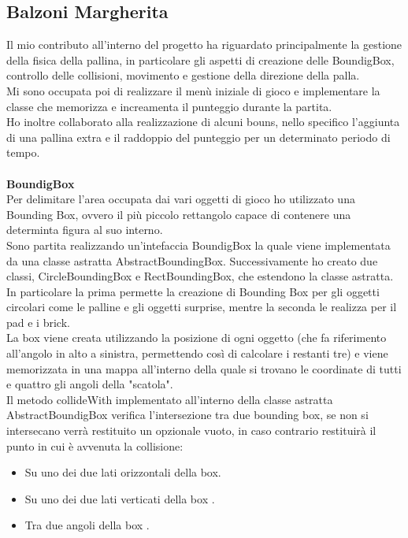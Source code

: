 \documentclass[a4paper,12pt]{report}
\begin{document}
\subsection{Balzoni Margherita}
Il mio contributo all'interno del progetto ha riguardato principalmente la gestione della fisica della pallina, in particolare gli aspetti di creazione delle BoundigBox, controllo delle collisioni, movimento e gestione della direzione della palla.
\\Mi sono occupata poi di realizzare il menù iniziale di gioco e implementare la classe che memorizza e increamenta il punteggio durante la partita.
\\Ho inoltre collaborato alla realizzazione di alcuni bouns, nello specifico l'aggiunta di una pallina extra e il raddoppio del punteggio per un determinato periodo di tempo.\\\\
\textbf{BoundigBox}\\
Per delimitare l'area occupata dai vari oggetti di gioco ho utilizzato una Bounding Box, ovvero il più piccolo rettangolo capace di contenere una determinta figura al suo interno.\\
Sono partita realizzando un'intefaccia BoundigBox la quale viene implementata da una classe astratta AbstractBoundingBox.
Successivamente ho creato due classi, CircleBoundingBox e RectBoundingBox, che estendono la classe astratta. In particolare la prima permette la creazione di Bounding Box per gli oggetti circolari come le palline e gli oggetti surprise, mentre la seconda le realizza per il pad e i brick.
\\La box viene creata utilizzando la posizione di ogni oggetto (che fa riferimento all'angolo in alto a sinistra, permettendo così di calcolare i restanti tre) e viene memorizzata in una mappa all'interno della quale si trovano le coordinate di tutti e quattro gli angoli della "scatola".
\\Il metodo collideWith implementato all'interno della classe astratta AbstractBoundigBox verifica l'intersezione tra due bounding box, se non si intersecano verrà restituito un opzionale vuoto, in caso contrario restituirà il punto in cui è avvenuta la collisione:
\begin{itemize}
    \item  Su uno dei due lati orizzontali della box.
    \item  Su uno dei due lati verticati della box .
    \item  Tra due angoli della box .
\end{itemize}
\end{document}
